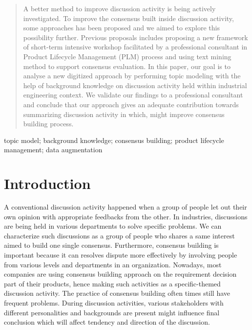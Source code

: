 \documentclass[10pt, conference, compsocconf]{IEEEtran}
\begin{document}
\begin{abstract}
A better method to improve discussion activity is being actively investigated. To improve the consensus built inside discussion activity, some approaches has been proposed and we aimed to explore this possibility further. Previous proposals includes proposing a new framework of short-term intensive workshop facilitated by a professional consultant in Product Lifecycle Management (PLM) process and using text mining method to support consensus evaluation. In this paper, our goal is to analyse a new digitized approach by performing topic modeling with the help of background knowledge on discussion activity held within industrial engineering context. We validate our findings to a professional consultant and conclude that our approach gives an adequate contribution  towards summarizing discussion activity in which, might improve consensus building process.

\end{abstract}

\begin{IEEEkeywords}
topic model; background knowledge; consensus building; product lifecycle management; data augmentation

\end{IEEEkeywords}


%
\IEEEpeerreviewmaketitle



\section{Introduction}
A conventional discussion activity happened when a group of people let out their own opinion with appropriate feedbacks from the other. In industries, discussions are being held in various departments to solve specific problems. We can characterize such discussions as a group of people who shares a same interest aimed to build one single consensus. Furthermore, consensus building is important because it can resolves dispute more effectively by involving people from various levels and departments in an organization\cite{b1}. Nowadays, most companies are using consensus building approach on the requirement decision part of their products, hence making such activities as a specific-themed discussion activity. The practice of consensus building often times still have frequent problems. During discussion activities, various stakeholders with different personalities and backgrounds are present might influence final conclusion\cite{b2} which will affect tendency and direction of the discussion\cite{b3}.
 
\end{document}
